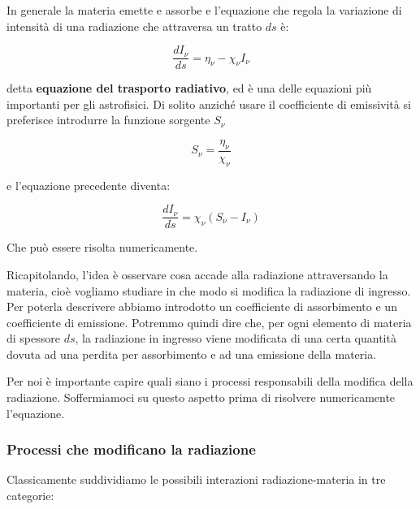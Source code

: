 In generale la materia emette e assorbe e l'equazione che regola la variazione di intensità di una radiazione che attraversa un tratto $ds$ è:

\begin{equation}
  \frac{dI_{\nu}}{ds} = \eta_{\nu} - \chi_{\nu} I_{\nu}
  \label{eq:trasp_rad}
\end{equation}

detta \textbf{equazione del trasporto radiativo}, ed è una delle equazioni più importanti per gli astrofisici. Di solito anziché usare il coefficiente di emissività si preferisce introdurre la funzione sorgente $S_{\nu}$

\begin{equation}
  S_{\nu}=\frac{\eta_{\nu}}{\chi_{\nu}}
\end{equation}

e l'equazione precedente diventa:

\begin{equation}
  \frac{dI_{\nu}}{ds}=\chi_{\nu} \left( S_{\nu} - I_{\nu} \right)
\end{equation}

Che può essere risolta numericamente.

Ricapitolando, l'idea è osservare cosa accade alla radiazione attraversando la materia, cioè vogliamo studiare in che modo si modifica la radiazione di ingresso. Per poterla descrivere abbiamo introdotto un coefficiente di assorbimento e un coefficiente di emissione. Potremmo quindi dire che, per ogni elemento di materia di spessore $ds$, la radiazione in ingresso viene modificata di una certa quantità dovuta ad una perdita per assorbimento e ad una emissione della materia.

Per noi è importante capire quali siano i processi responsabili della modifica della radiazione. Soffermiamoci su questo aspetto prima di risolvere numericamente l'equazione.
\subsubsection{Processi che modificano la radiazione}
Classicamente suddividiamo le possibili interazioni radiazione-materia in tre categorie:

